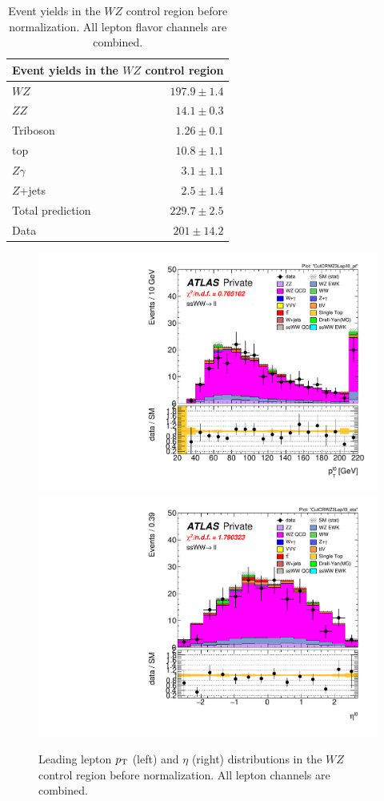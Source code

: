 \begin{table}[htbp]
  \centering
  \begin{tabular}{l r}
    \multicolumn{2}{c}{Event yields in the $WZ$ control region} \\
    \hline\hline
    $WZ$     & $197.9\pm 1.4$ \\
    $ZZ$     & $14.1\pm 0.3$ \\
    Triboson & $1.26\pm 0.1$ \\
    top      & $10.8\pm 1.1$ \\
    $Z\gamma$& $3.1\pm 1.1$ \\
    $Z$+jets & $2.5\pm 1.4$ \\
    \hline
    Total prediction & $229.7\pm 2.5$ \\
    Data             & $201 \pm 14.2$ \\
    \hline
  \end{tabular}
  \caption{Event yields in the $WZ$ control region before normalization.  All lepton flavor channels are combined.}
  \label{tab:ssww13tev_wzcr_yields}
\end{table}

\begin{figure}[htbp]
  \centering
  \includegraphics[width=.48\textwidth]{figs/ssww_13tev/backgrounds/wz/ll-CutCRWZ3Lep-l0_pt-lin}
  \includegraphics[width=.48\textwidth]{figs/ssww_13tev/backgrounds/wz/ll-CutCRWZ3Lep-l0_eta-lin}
  \caption{Leading lepton $p_{\mathrm{T}}$ (left) and $\eta$ (right) distributions in the $WZ$ control region before normalization.  All lepton channels are combined.}
  \label{fig:ssww13tev_wzcr_mlll}
\end{figure}

